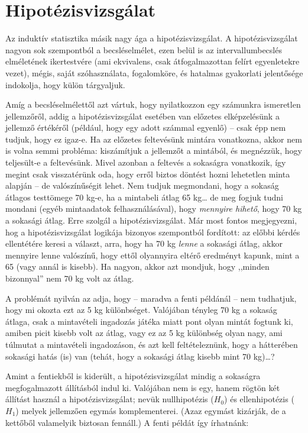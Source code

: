 \documentclass[]{book}
\begin{document}
\section{Hipotézisvizsgálat}\label{induktivhipotezisvizsgalat}

Az induktív statisztika másik nagy ága a hipotézisvizsgálat. A
hipotézisvizsgálat nagyon sok szempontból a becsléselmélet, ezen belül
is az intervallumbecslés elméletének ikertestvére (ami ekvivalens, csak
átfogalmazottan felírt egyenletekre vezet), mégis, saját szóhasználata,
fogalomköre, és hatalmas gyakorlati jelentősége indokolja, hogy külön
tárgyaljuk.

Amíg a becsléselmélettől azt vártuk, hogy nyilatkozzon egy számunkra
ismeretlen jellemzőről, addig a hipotézisvizsgálat esetében van előzetes
elképzelésünk a jellemző értékéről (például, hogy egy adott számmal
egyenlő) -- csak épp nem tudjuk, hogy ez igaz-e. Ha az előzetes
feltevésünk mintára vonatkozna, akkor nem is volna semmi probléma:
kiszámítjuk a jellemzőt a mintából, és megnézzük, hogy teljesült-e a
feltevésünk. Mivel azonban a feltevés a sokaságra vonatkozik, így megint
csak visszatérünk oda, hogy erről biztos döntést hozni lehetetlen minta
alapján -- de valószínűségit lehet. Nem tudjuk megmondani, hogy a
sokaság átlagos testtömege 70 kg-e, ha a mintabeli átlag 65 kg\dots{} de
meg fogjuk tudni mondani (egyéb mintaadatok felhasználásával), hogy
\emph{mennyire hihető}, hogy 70 kg a sokasági átlag. Erre szolgál a
hipotézisvizsgálat. Már most fontos megjegyezni, hog a
hipotézisvizsgálat logikája bizonyos szempontból fordított: az előbbi
kérdés ellentétére keresi a választ, arra, hogy ha 70 kg \emph{lenne} a
sokasági átlag, akkor mennyire lenne valószínű, hogy ettől olyannyira
eltérő eredményt kapunk, mint a 65 (vagy annál is kisebb). Ha nagyon,
akkor azt mondjuk, hogy ,,minden bizonnyal'' nem 70 kg volt az átlag.

A problémát nyilván az adja, hogy -- maradva a fenti példánál -- nem
tudhatjuk, hogy mi okozta ezt az 5 kg különbséget. Valójában tényleg 70
kg a sokaság átlaga, csak a mintavételi ingadozás játéka miatt pont
olyan mintát fogtunk ki, amiben picit kisebb volt az átlag, vagy ez az 5
kg különbség olyan nagy, ami túlmutat a mintavételi ingadozáson, és azt
kell feltételeznünk, hogy a hátterében sokasági hatás (is) van (tehát,
hogy a sokasági átlag kisebb mint 70 kg)\dots{}?

Amint a fentiekből is kiderült, a hipotézisvizsgálat mindig a sokaságra
megfogalmazott állításból indul ki. Valójában nem is egy, hanem rögtön
két állítást használ a hipotézisvizsgálat; nevük nullhipotézis (\(H_0\))
és ellenhipotézis (\(H_1\)) melyek jellemzően egymás komplementerei.
(Azaz egymást kizárják, de a kettőből valamelyik biztosan fennáll.) A
fenti példát így írhatnánk:
\end{document}
